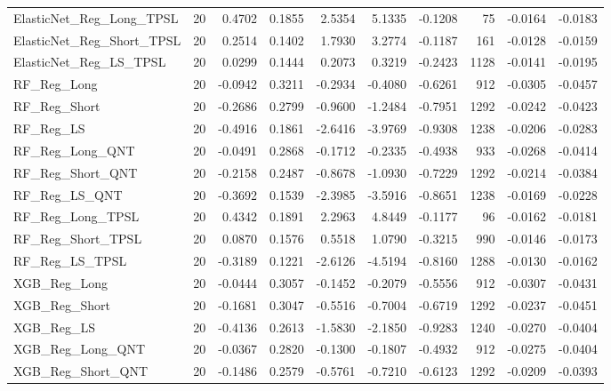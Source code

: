 \begin{tabular}{llrrrrrrrr}
\cline{1-10}
ElasticNet\_Reg\_Long\_TPSL & 20 & 0.4702 & 0.1855 & 2.5354 & 5.1335 & -0.1208 & 75 & -0.0164 & -0.0183 \\
\cline{1-10}
ElasticNet\_Reg\_Short\_TPSL & 20 & 0.2514 & 0.1402 & 1.7930 & 3.2774 & -0.1187 & 161 & -0.0128 & -0.0159 \\
\cline{1-10}
ElasticNet\_Reg\_LS\_TPSL & 20 & 0.0299 & 0.1444 & 0.2073 & 0.3219 & -0.2423 & 1128 & -0.0141 & -0.0195 \\
\cline{1-10}
RF\_Reg\_Long & 20 & -0.0942 & 0.3211 & -0.2934 & -0.4080 & -0.6261 & 912 & -0.0305 & -0.0457 \\
\cline{1-10}
RF\_Reg\_Short & 20 & -0.2686 & 0.2799 & -0.9600 & -1.2484 & -0.7951 & 1292 & -0.0242 & -0.0423 \\
\cline{1-10}
RF\_Reg\_LS & 20 & -0.4916 & 0.1861 & -2.6416 & -3.9769 & -0.9308 & 1238 & -0.0206 & -0.0283 \\
\cline{1-10}
RF\_Reg\_Long\_QNT & 20 & -0.0491 & 0.2868 & -0.1712 & -0.2335 & -0.4938 & 933 & -0.0268 & -0.0414 \\
\cline{1-10}
RF\_Reg\_Short\_QNT & 20 & -0.2158 & 0.2487 & -0.8678 & -1.0930 & -0.7229 & 1292 & -0.0214 & -0.0384 \\
\cline{1-10}
RF\_Reg\_LS\_QNT & 20 & -0.3692 & 0.1539 & -2.3985 & -3.5916 & -0.8651 & 1238 & -0.0169 & -0.0228 \\
\cline{1-10}
RF\_Reg\_Long\_TPSL & 20 & 0.4342 & 0.1891 & 2.2963 & 4.8449 & -0.1177 & 96 & -0.0162 & -0.0181 \\
\cline{1-10}
RF\_Reg\_Short\_TPSL & 20 & 0.0870 & 0.1576 & 0.5518 & 1.0790 & -0.3215 & 990 & -0.0146 & -0.0173 \\
\cline{1-10}
RF\_Reg\_LS\_TPSL & 20 & -0.3189 & 0.1221 & -2.6126 & -4.5194 & -0.8160 & 1288 & -0.0130 & -0.0162 \\
\cline{1-10}
XGB\_Reg\_Long & 20 & -0.0444 & 0.3057 & -0.1452 & -0.2079 & -0.5556 & 912 & -0.0307 & -0.0431 \\
\cline{1-10}
XGB\_Reg\_Short & 20 & -0.1681 & 0.3047 & -0.5516 & -0.7004 & -0.6719 & 1292 & -0.0237 & -0.0451 \\
\cline{1-10}
XGB\_Reg\_LS & 20 & -0.4136 & 0.2613 & -1.5830 & -2.1850 & -0.9283 & 1240 & -0.0270 & -0.0404 \\
\cline{1-10}
XGB\_Reg\_Long\_QNT & 20 & -0.0367 & 0.2820 & -0.1300 & -0.1807 & -0.4932 & 912 & -0.0275 & -0.0404 \\
\cline{1-10}
XGB\_Reg\_Short\_QNT & 20 & -0.1486 & 0.2579 & -0.5761 & -0.7210 & -0.6123 & 1292 & -0.0209 & -0.0393 \\

\end{tabular}
